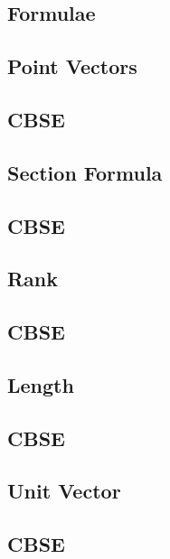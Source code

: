 \documentclass[journal]{IEEEtran}
\begin{document}
\subsection{Formulae}

\subsection{Point Vectors}

\subsection{CBSE}

%
\subsection{Section Formula}

\subsection{CBSE}

\subsection{Rank}

\subsection{CBSE}

\subsection{Length}

\subsection{CBSE}

\subsection{Unit Vector}

\subsection{CBSE}

%
%
\newpage
\end{document}
